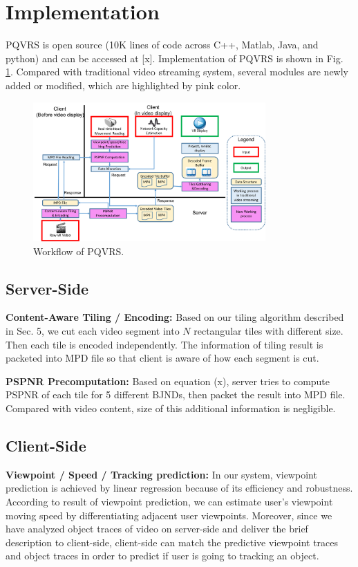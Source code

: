 \section{Implementation}

PQVRS is open source (10K lines of code across C++, Matlab, Java, and python) and can be accessed at [x]. Implementation of PQVRS is shown in Fig. \ref{implementation}. Compared with traditional video streaming system, several modules are newly added or modified, which are highlighted by pink color.

\begin{figure}
  \centering
  \includegraphics[width=3.5in]{images/implementation.pdf}
  \caption{Workflow of PQVRS.}
  \label{implementation}
  \end{figure}

\subsection{Server-Side}

\textbf{Content-Aware Tiling / Encoding:} Based on our tiling algorithm described in Sec. 5, we cut each video segment into $N$ rectangular tiles with different size. Then each tile is encoded independently. The information of tiling result is packeted into MPD file so that client is aware of how each segment is cut. 

\textbf{PSPNR Precomputation:} Based on equation (x), server tries to compute PSPNR of each tile for 5 different BJNDs, then packet the result into MPD file. Compared with video content, size of this additional information is negligible.

\subsection{Client-Side}

\textbf{Viewpoint / Speed / Tracking prediction:} In our system, viewpoint prediction is achieved by linear regression because of its efficiency and robustness. According to result of viewpoint prediction, we can estimate user's viewpoint moving speed by differentiating adjacent user viewpoints. Moreover, since we have analyzed object traces of video on server-side and deliver the brief description to client-side, client-side can match the predictive viewpoint traces and object traces in order to predict if user is going to tracking an object.

